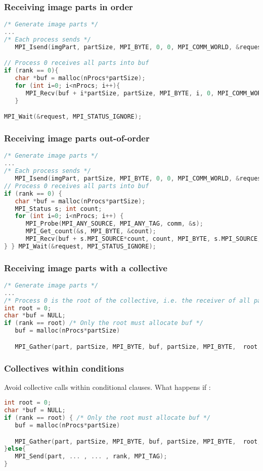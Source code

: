 \begin{frame}[containsverbatim]
\frametitle{Receiving image parts in order}
\begin{lstlisting}[language=C,frame=lines]
/* Generate image parts */
...
/* Each process sends */
   MPI_Isend(imgPart, partSize, MPI_BYTE, 0, 0, MPI_COMM_WORLD, &request);

// Process 0 receives all parts into buf
if (rank == 0){
   char *buf = malloc(nProcs*partSize);
   for (int i=0; i<nProcs; i++){
      MPI_Recv(buf + i*partSize, partSize, MPI_BYTE, i, 0, MPI_COMM_WORLD, MPI_STATUS_IGNORE);
   }

MPI_Wait(&request, MPI_STATUS_IGNORE);
\end{lstlisting}
\end{frame}


\begin{frame}[containsverbatim]
\frametitle{Receiving image parts out-of-order}
\begin{lstlisting}[language=C,frame=lines]
/* Generate image parts */
...
/* Each process sends */
   MPI_Isend(imgPart, partSize, MPI_BYTE, 0, 0, MPI_COMM_WORLD, &request);
// Process 0 receives all parts into buf
if (rank == 0) {
   char *buf = malloc(nProcs*partSize);
   MPI_Status s; int count;
   for (int i=0; i<nProcs; i++) {
      MPI_Probe(MPI_ANY_SOURCE, MPI_ANY_TAG, comm, &s);
      MPI_Get_count(&s, MPI_BYTE, &count);
      MPI_Recv(buf + s.MPI_SOURCE*count, count, MPI_BYTE, s.MPI_SOURCE, s.MPI_TAG, MPI_COMM_WORLD, MPI_STATUS_IGNORE);
} } MPI_Wait(&request, MPI_STATUS_IGNORE);
\end{lstlisting}
\end{frame}

\begin{frame}[containsverbatim]
\frametitle{Receiving image parts with a collective}
\begin{lstlisting}[language=C,frame=lines]
/* Generate image parts */
...
/* Process 0 is the root of the collective, i.e. the receiver of all parts */
int root = 0;
char *buf = NULL;
if (rank == root) /* Only the root must allocate buf */
   buf = malloc(nProcs*partSize)

   MPI_Gather(part, partSize, MPI_BYTE, buf, partSize, MPI_BYTE,  root, MPI_COMM_WORLD);
\end{lstlisting}
\end{frame}




\begin{frame}[containsverbatim]
\frametitle{Collectives within conditions}

Avoid collective calls within conditional clauses. What happens if :

\begin{lstlisting}[language=C,frame=lines]
int root = 0;
char *buf = NULL;
if (rank == root) { /* Only the root must allocate buf */
   buf = malloc(nProcs*partSize)

   MPI_Gather(part, partSize, MPI_BYTE, buf, partSize, MPI_BYTE,  root, MPI_COMM_WORLD);
}else{
   MPI_Send(part, ... , ... , rank, MPI_TAG);
}
\end{lstlisting}
\end{frame}


